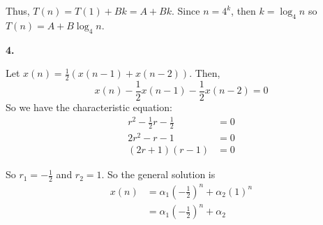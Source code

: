 \documentclass[letterpaper, 11pt]{article}
\newcommand{\hwnumber}[1]{\medskip \noindent\textbf{#1.} \smallskip}
\begin{document}
Thus, \(T(n) = T(1) + Bk = A + Bk\). Since \(n = 4^k\), then \(k = \log_4 n\)
so \(T(n) = A + B\log_4 n\).

\hwnumber{4}

Let \(x(n) = \frac{1}{2}(x(n - 1) + x(n - 2))\). Then,
\[x(n) - \frac{1}{2}x(n - 1) - \frac{1}{2}x(n - 2) = 0\]
So we have the characteristic equation:
\begin{align*}
  r^2 - \frac{1}{2}r - \frac{1}{2} &= 0\\
  2r^2 - r - 1 &= 0 \\
  (2r + 1)(r - 1) &= 0
\end{align*}

So \(r_1 = -\frac{1}{2}\) and \(r_2 = 1\). So the general solution is 
\begin{align*}
  x(n) &= \alpha_1 \left(-\frac{1}{2}\right)^n + \alpha_2(1)^n\\
       &= \alpha_1 \left(-\frac{1}{2}\right)^n + \alpha_2\\
\end{align*}
\end{document}
